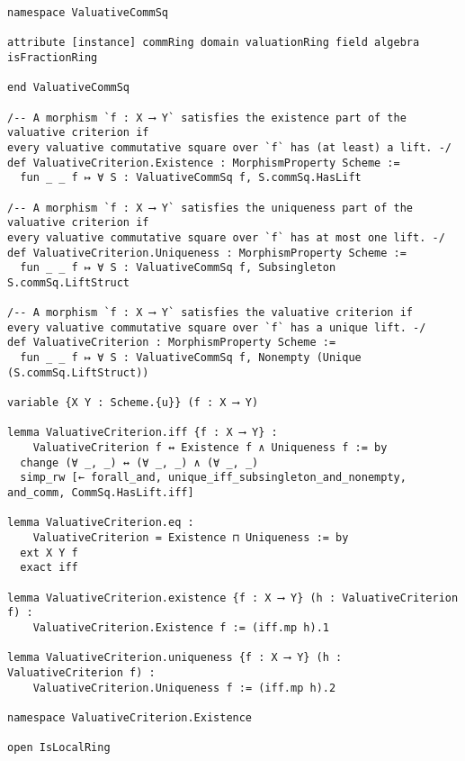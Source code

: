 \documentclass{article}
\begin{document}
\begin{lstlisting}[language=Lean, caption={ValuativeCriterion.lean}]
namespace ValuativeCommSq

attribute [instance] commRing domain valuationRing field algebra isFractionRing

end ValuativeCommSq

/-- A morphism `f : X ⟶ Y` satisfies the existence part of the valuative criterion if
every valuative commutative square over `f` has (at least) a lift. -/
def ValuativeCriterion.Existence : MorphismProperty Scheme :=
  fun _ _ f ↦ ∀ S : ValuativeCommSq f, S.commSq.HasLift

/-- A morphism `f : X ⟶ Y` satisfies the uniqueness part of the valuative criterion if
every valuative commutative square over `f` has at most one lift. -/
def ValuativeCriterion.Uniqueness : MorphismProperty Scheme :=
  fun _ _ f ↦ ∀ S : ValuativeCommSq f, Subsingleton S.commSq.LiftStruct

/-- A morphism `f : X ⟶ Y` satisfies the valuative criterion if
every valuative commutative square over `f` has a unique lift. -/
def ValuativeCriterion : MorphismProperty Scheme :=
  fun _ _ f ↦ ∀ S : ValuativeCommSq f, Nonempty (Unique (S.commSq.LiftStruct))

variable {X Y : Scheme.{u}} (f : X ⟶ Y)

lemma ValuativeCriterion.iff {f : X ⟶ Y} :
    ValuativeCriterion f ↔ Existence f ∧ Uniqueness f := by
  change (∀ _, _) ↔ (∀ _, _) ∧ (∀ _, _)
  simp_rw [← forall_and, unique_iff_subsingleton_and_nonempty, and_comm, CommSq.HasLift.iff]

lemma ValuativeCriterion.eq :
    ValuativeCriterion = Existence ⊓ Uniqueness := by
  ext X Y f
  exact iff

lemma ValuativeCriterion.existence {f : X ⟶ Y} (h : ValuativeCriterion f) :
    ValuativeCriterion.Existence f := (iff.mp h).1

lemma ValuativeCriterion.uniqueness {f : X ⟶ Y} (h : ValuativeCriterion f) :
    ValuativeCriterion.Uniqueness f := (iff.mp h).2

namespace ValuativeCriterion.Existence

open IsLocalRing


\end{lstlisting}
\end{document}
